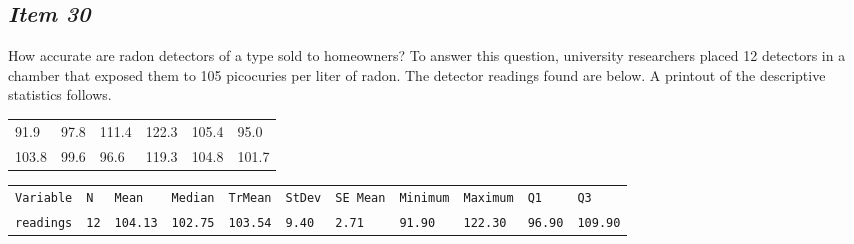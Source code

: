 \subsection{\textbf{\textit{Item 30}}}


How accurate are radon detectors of a type sold to homeowners? To answer this question, university researchers placed 12 detectors in a chamber that exposed them to 105 picocuries per liter of radon. The detector readings found are below. A printout of the descriptive statistics follows. 










\begin{table}[!ht]


\begin{center}


\begin{tabular}{llllll}


91.9 & 97.8 & 111.4 & 122.3 & 105.4 & 95.0\\


103.8 & 99.6 & 96.6 & 119.3 & 104.8 & 101.7\\


\end{tabular}


\end{center}


\end{table}





\begin{table}[!ht]


\begin{center}


\begin{tabular}{lllllllllll}


\texttt{Variable} & \texttt{N} & \texttt{Mean} & \texttt{Median} & \texttt{TrMean} & \texttt{StDev} & \texttt{SE Mean} & \texttt{Minimum} & \texttt{Maximum} & \texttt{Q1} & \texttt{Q3}\\


\texttt{readings} & \texttt{12} & \texttt{104.13} & \texttt{102.75} & \texttt{103.54} & \texttt{9.40} & \texttt{2.71} & \texttt{91.90} & \texttt{122.30} & \texttt{96.90} & \texttt{109.90}\\


\end{tabular}


\end{center}


\end{table}






